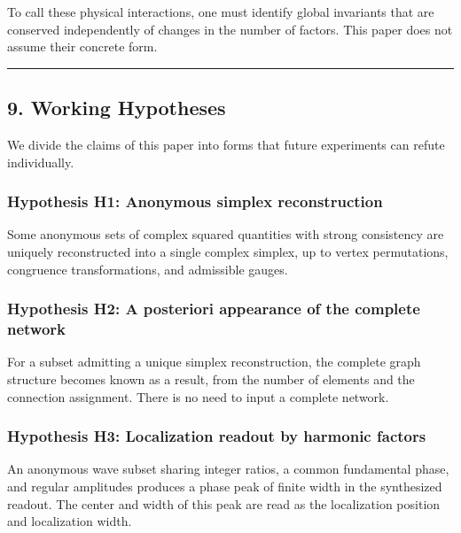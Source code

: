 \documentclass[
  a4paper,
]{article}
\begin{document}
To call these physical interactions, one must identify global invariants
that are conserved independently of changes in the number of factors.
This paper does not assume their concrete form.

\begin{center}\rule{0.5\linewidth}{0.5pt}\end{center}

\subsection{9. Working Hypotheses}\label{working-hypotheses}

We divide the claims of this paper into forms that future experiments
can refute individually.

\subsubsection{Hypothesis H1: Anonymous simplex
reconstruction}\label{hypothesis-h1-anonymous-simplex-reconstruction}

Some anonymous sets of complex squared quantities with strong
consistency are uniquely reconstructed into a single complex simplex, up
to vertex permutations, congruence transformations, and admissible
gauges.

\subsubsection{Hypothesis H2: A posteriori appearance of the complete
network}\label{hypothesis-h2-a-posteriori-appearance-of-the-complete-network}

For a subset admitting a unique simplex reconstruction, the complete
graph structure becomes known as a result, from the number of elements
and the connection assignment. There is no need to input a complete
network.

\subsubsection{Hypothesis H3: Localization readout by harmonic
factors}\label{hypothesis-h3-localization-readout-by-harmonic-factors}

An anonymous wave subset sharing integer ratios, a common fundamental
phase, and regular amplitudes produces a phase peak of finite width in
the synthesized readout. The center and width of this peak are read as
the localization position and localization width.
\end{document}
